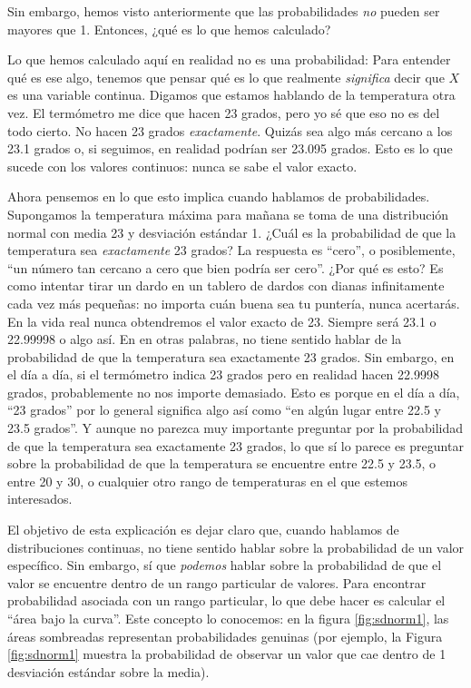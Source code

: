 \documentclass[spanish,]{book}
\begin{document}
Sin embargo, hemos visto anteriormente que las probabilidades \emph{no}
pueden ser mayores que 1. Entonces, ¿qué es lo que hemos calculado?

Lo que hemos calculado aquí en realidad no es una probabilidad: Para
entender qué es ese algo, tenemos que pensar qué es lo que realmente
\emph{significa} decir que \(X\) es una variable continua. Digamos que
estamos hablando de la temperatura otra vez. El termómetro me dice que
hacen 23 grados, pero yo sé que eso no es del todo cierto. No hacen 23
grados \emph{exactamente}. Quizás sea algo más cercano a los 23.1 grados
o, si seguimos, en realidad podrían ser 23.095 grados. Esto es lo que
sucede con los valores continuos: nunca se sabe el valor exacto.

Ahora pensemos en lo que esto implica cuando hablamos de probabilidades.
Supongamos la temperatura máxima para mañana se toma de una distribución
normal con media 23 y desviación estándar 1. ¿Cuál es la probabilidad de
que la temperatura sea \emph{exactamente} 23 grados? La respuesta es
``cero'', o posiblemente, ``un número tan cercano a cero que bien podría
ser cero''. ¿Por qué es esto? Es como intentar tirar un dardo en un
tablero de dardos con dianas infinitamente cada vez más pequeñas: no
importa cuán buena sea tu puntería, nunca acertarás. En la vida real
nunca obtendremos el valor exacto de 23. Siempre será 23.1 o 22.99998 o
algo así. En en otras palabras, no tiene sentido hablar de la
probabilidad de que la temperatura sea exactamente 23 grados. Sin
embargo, en el día a día, si el termómetro indica 23 grados pero en
realidad hacen 22.9998 grados, probablemente no nos importe demasiado.
Esto es porque en el día a día, ``23 grados'' por lo general significa
algo así como ``en algún lugar entre 22.5 y 23.5 grados''. Y aunque no
parezca muy importante preguntar por la probabilidad de que la
temperatura sea exactamente 23 grados, lo que sí lo parece es preguntar
sobre la probabilidad de que la temperatura se encuentre entre 22.5 y
23.5, o entre 20 y 30, o cualquier otro rango de temperaturas en el que
estemos interesados.

El objetivo de esta explicación es dejar claro que, cuando hablamos de
distribuciones continuas, no tiene sentido hablar sobre la probabilidad
de un valor específico. Sin embargo, sí que \emph{podemos} hablar sobre
la probabilidad de que el valor se encuentre dentro de un rango
particular de valores. Para encontrar probabilidad asociada con un rango
particular, lo que debe hacer es calcular el ``área bajo la curva''.
Este concepto lo conocemos: en la figura \ref{fig:sdnorm1}, las áreas
sombreadas representan probabilidades genuinas (por ejemplo, la Figura
\ref{fig:sdnorm1} muestra la probabilidad de observar un valor que cae
dentro de 1 desviación estándar sobre la media).
\end{document}
